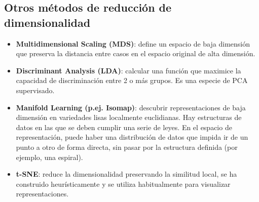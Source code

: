 \subsection{Otros métodos de reducción de dimensionalidad}
\begin{itemize}
\item \textbf{Multidimensional Scaling (MDS)}: define un espacio de baja dimensión que preserva la distancia entre casos en el espacio original de alta dimensión.
\item \textbf{Discriminant Analysis (LDA)}: calcular una función que maximice la capacidad de discriminación entre 2 o más grupos. Es una especie de PCA supervisado. 
\item \textbf{Manifold Learning (p.ej. Isomap)}: descubrir representaciones de baja dimensión en variedades lisas localmente euclidianas. Hay estructuras de datos en las que se deben cumplir una serie de leyes. En el espacio de representación, puede haber una distribución de datos que impida ir de un punto a otro de forma directa, sin pasar por la estructura definida (por ejemplo, una espiral).
\item \textbf{t-SNE}: reduce la dimensionalidad preservando la similitud local, se ha construido heurísticamente y se utiliza habitualmente para visualizar representaciones.
\end{itemize}
